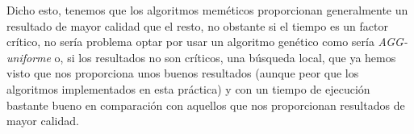Dicho esto, tenemos que los algoritmos meméticos proporcionan generalmente un resultado de mayor calidad que el resto, no obstante si el tiempo es un factor crítico, no sería problema optar por usar un algoritmo genético como sería \textit{AGG-uniforme} o, si los resultados no son críticos, una búsqueda local, que ya hemos visto que nos proporciona unos buenos resultados (aunque peor que los algoritmos implementados en esta práctica) y con un tiempo de ejecución bastante bueno en comparación con aquellos que nos proporcionan resultados de mayor calidad.









